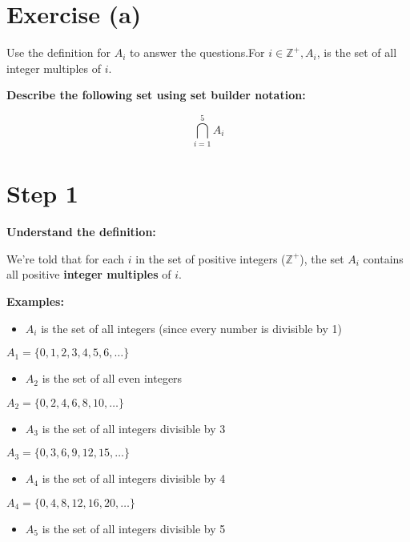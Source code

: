 \documentclass[
  letterpaper,
  DIV=11,
  numbers=noendperiod]{scrreprt}
\providecommand{\tightlist}{%
  \setlength{\itemsep}{0pt}\setlength{\parskip}{0pt}}
\begin{document}
\section{Exercise (a)}

Use the definition for \(A_i\) to answer the questions.For
\(i \in \mathbb{Z^+}, A_i\), is the set of all integer multiples of
\(i\).

\textbf{Describe the following set using set builder notation:}

\[\bigcap^5_{i=1} A_i\]

\section{Step 1}

\textbf{Understand the definition:}

We're told that for each \(i\) in the set of positive integers
(\(\mathbb{Z^+}\)), the set \(A_i\) contains all positive
{\textbf{integer multiples}} of \(i\).

\textbf{Examples:}

\begin{itemize}
\tightlist
\item
  \(A_i\) is the set of all integers (since every number is divisible by
  1)
\end{itemize}

\(A_1 = \{0,1,2,3,4,5,6, \ldots\}\)

\begin{itemize}
\tightlist
\item
  \(A_2\) is the set of all even integers
\end{itemize}

\(A_2 = \{0,2,4,6,8,10, \ldots\}\)

\begin{itemize}
\tightlist
\item
  \(A_3\) is the set of all integers divisible by 3
\end{itemize}

\(A_3 = \{0,3,6,9,12,15, \ldots\}\)

\begin{itemize}
\tightlist
\item
  \(A_4\) is the set of all integers divisible by 4
\end{itemize}

\(A_4 = \{0,4,8,12,16,20, \ldots\}\)

\begin{itemize}
\tightlist
\item
  \(A_5\) is the set of all integers divisible by 5
\end{itemize}
\end{document}
